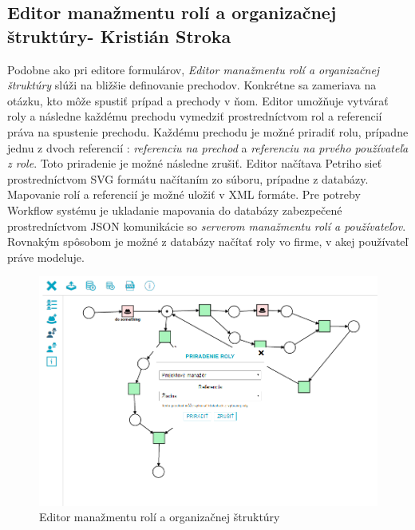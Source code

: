 \subsection{Editor manažmentu rolí a organizačnej štruktúry- Kristián Stroka}
\label{Editor manažmentu rolí a organizačnej štruktúry}
Podobne ako pri editore formulárov, \emph{Editor manažmentu rolí a organizačnej štruktúry} slúži na bližšie definovanie prechodov. Konkrétne sa zameriava na otázku, kto môže spustiť prípad a prechody v ňom. Editor umožňuje vytvárať roly a následne každému prechodu vymedziť prostredníctvom  rol a referencií práva na spustenie prechodu. Každému prechodu je možné priradiť rolu, prípadne jednu z dvoch referencií : \emph{referenciu na prechod} a \emph{referenciu na prvého používateľa z role}. Toto priradenie je možné následne zrušiť. Editor načítava Petriho sieť prostredníctvom SVG formátu načítaním zo súboru, prípadne z databázy. Mapovanie rolí a referencií je možné uložiť v XML formáte. Pre potreby Workflow systému je ukladanie mapovania do databázy zabezpečené prostredníctvom JSON komunikácie  so \emph{serverom manažmentu rolí a používateľov}. Rovnakým spôsobom je možné z databázy načítať roly vo firme, v akej používateľ práve modeluje.

\begin{figure}[h]
	\centering
	\includegraphics[width=0.7\linewidth]{images/kristian}
	\caption{Editor manažmentu rolí a organizačnej štruktúry}
	\label{fig:Editor manažmentu rolí a organizačnej štruktúry}
\end{figure}


